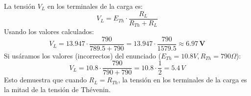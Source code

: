 \documentclass[12pt,a4paper]{article}
\begin{document}
La tensión $V_L$ en los terminales de la carga es:
$$ V_L = E_{Th} \cdot \frac{R_L}{R_{Th} + R_L} $$
Usando los valores calculados:
$$ V_L = 13.947 \cdot \frac{790}{789.5 + 790} = 13.947 \cdot \frac{790}{1579.5} \approx \mathbf{6.97 \, V} $$
Si usáramos los valores (incorrectos) del enunciado ($E_{Th}=10.8V, R_{Th}=790\Omega$):
$$ V_L = 10.8 \cdot \frac{790}{790 + 790} = 10.8 \cdot \frac{1}{2} = 5.4 \, V $$
Esto demuestra que cuando $R_L = R_{Th}$, la tensión en los terminales de la carga es la mitad de la tensión de Thévenin.
\end{document}
